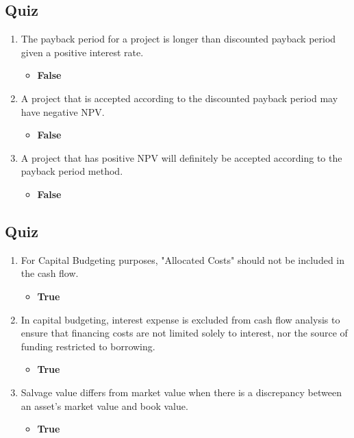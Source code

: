 \begin{tiny}
  \subsection{Quiz}
  \begin{enumerate}[itemsep=-0.5em]
    \item The payback period for a project is longer than discounted payback period given a positive interest rate.
          \begin{itemize}[itemsep=-0.2em]
            \item \textbf{False}
          \end{itemize}
    \item A project that is accepted according to the discounted payback period may have negative NPV.
          \begin{itemize}[itemsep=-0.2em]
            \item \textbf{False}
          \end{itemize}
    \item A project that has positive NPV will definitely be accepted according to the payback period method.
          \begin{itemize}[itemsep=-0.2em]
            \item \textbf{False}
          \end{itemize}
  \end{enumerate}
  \subsection{Quiz}
  \begin{enumerate}[itemsep=-0.5em]
    \item For Capital Budgeting purposes, "Allocated Costs" should not be included in the cash flow.
          \begin{itemize}[itemsep=-0.2em]
            \item \textbf{True}
          \end{itemize}
    \item In capital budgeting, interest expense is excluded from cash flow analysis to ensure that financing costs are not limited solely to interest, nor the source of funding restricted to borrowing.
          \begin{itemize}[itemsep=-0.2em]
            \item \textbf{True}
          \end{itemize}
    \item Salvage value differs from market value when there is a discrepancy between an asset's market value and book value.
          \begin{itemize}[itemsep=-0.2em]
            \item \textbf{True}
          \end{itemize}
  \end{enumerate}

\end{tiny}
